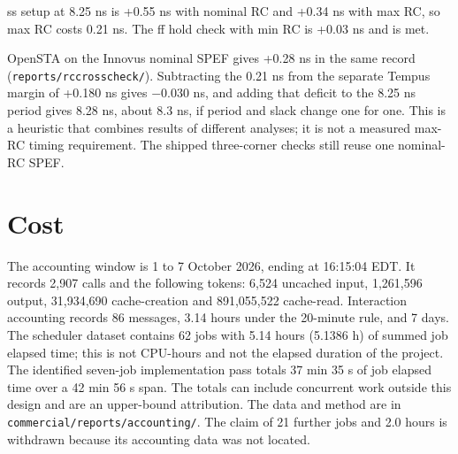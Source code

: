 \documentclass[11pt,letterpaper]{article}
\newcommand{\sk}[1]{\texttt{#1}}
\renewcommand{\_}{\textunderscore\penalty0\hskip0pt\relax}
\begin{document}
ss setup at 8.25 ns is +0.55 ns with nominal RC and +0.34 ns with max RC, so max RC costs 0.21 ns. The ff hold check with min RC is +0.03 ns and is met.

OpenSTA on the Innovus nominal SPEF gives +0.28 ns in the same record (\sk{reports/rc\_crosscheck/}). Subtracting the 0.21 ns from the separate Tempus margin of +0.180 ns gives $-$0.030 ns, and adding that deficit to the 8.25 ns period gives 8.28 ns, about 8.3 ns, if period and slack change one for one. This is a heuristic that combines results of different analyses; it is not a measured max-RC timing requirement. The shipped three-corner checks still reuse one nominal-RC SPEF.

\section{Cost}
The accounting window is 1 to 7 October 2026, ending at 16:15:04 EDT. It records 2,907 calls and the following tokens: 6,524 uncached input, 1,261,596 output, 31,934,690 cache-creation and 891,055,522 cache-read. Interaction accounting records 86 messages, 3.14 hours under the 20-minute rule, and 7 days. The scheduler dataset contains 62 jobs with 5.14 hours (5.1386 h) of summed job elapsed time; this is not CPU-hours and not the elapsed duration of the project. The identified seven-job implementation pass totals 37 min 35 s of job elapsed time over a 42 min 56 s span. The totals can include concurrent work outside this design and are an upper-bound attribution. The data and method are in \sk{commercial/reports/accounting/}. The claim of 21 further jobs and 2.0 hours is withdrawn because its accounting data was not located.
\end{document}
